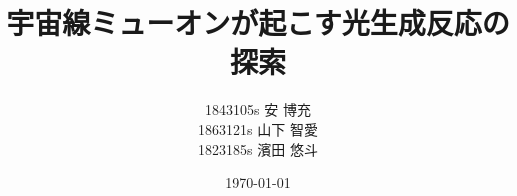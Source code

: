 \documentclass[a4paper,uplatex]{jsreport}
\begin{document}
\title{宇宙線ミューオンが起こす光生成反応の探索}
\author{1843105s 安 博充\\
        1863121s 山下 智愛\\
        1823185s 濱田 悠斗
}
\date{\today} %

\maketitle %
\tableofcontents %













\printbibliography[title = 参考文献]
\end{document}
